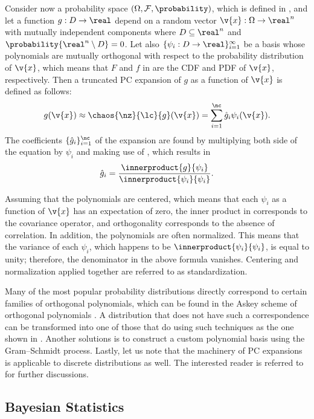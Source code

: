 Consider now a probability space $(\Omega, \mathcal{F}, \probability)$, which is
defined in , and let a function $g: D \to \real$ depend
on a random vector $\v{x}: \Omega \to \real^n$ with mutually independent
components where $D \subseteq \real^n$ and $\probability{\real^n \setminus D} =
0$. Let also $\{ \psi_i: D \to \real \}_{i = 1}^\infty$ be a basis whose
polynomials are mutually orthogonal with respect to the probability distribution
of $\v{x}$, which means that $F$ and $f$ in  are
the \ac{CDF} and \ac{PDF} of $\v{x}$, respectively. Then a truncated \ac{PC}
expansion of $g$ as a function of $\v{x}$ is defined as follows:
\[
  g(\v{x}) \approx \chaos{\nz}{\lc}{g}(\v{x}) = \sum_{i = 1}^\nc \hat{g}_i \psi_i(\v{x}).
\]
The coefficients $\{ \hat{g}_i \}_{i = 1}^\nc$ of the expansion are found by
multiplying both side of the equation by $\psi_i$ and making use of
, which results in
\[
  \hat{g}_i = \frac{\innerproduct{g}{\psi_i}}{\innerproduct{\psi_i}{\psi_i}}.
\]

Assuming that the polynomials are centered, which means that each $\psi_i$ as a
function of $\v{x}$ has an expectation of zero, the inner product in
 corresponds to the covariance operator, and
orthogonality corresponds to the absence of correlation. In addition, the
polynomials are often normalized. This means that the variance of each $\psi_i$,
which happens to be $\innerproduct{\psi_i}{\psi_i}$, is equal to unity;
therefore, the denominator in the above formula vanishes. Centering and
normalization applied together are referred to as standardization.

Many of the most popular probability distributions directly correspond to
certain families of orthogonal polynomials, which can be found in the Askey
scheme of orthogonal polynomials \cite{xiu2010}. A distribution that does not
have such a correspondence can be transformed into one of those that do using
such techniques as the one shown in . Another
solutions is to construct a custom polynomial basis using the Gram--Schmidt
process. Lastly, let us note that the machinery of \ac{PC} expansions is
applicable to discrete distributions as well. The interested reader is referred
to \cite{xiu2010} for further discussions.

\subsection{Bayesian Statistics}

